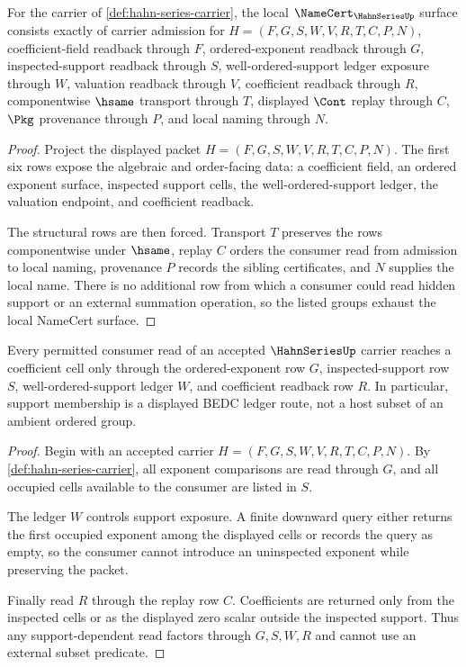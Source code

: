 \begin{theorem}
\label{thm:hahn-series-namecert-obligations}
For the carrier of \autoref{def:hahn-series-carrier}, the local $\NameCert_{\HahnSeriesUp}$ surface consists exactly of carrier admission for $H=(F,G,S,W,V,R,T,C,P,N)$, coefficient-field readback through $F$, ordered-exponent readback through $G$, inspected-support readback through $S$, well-ordered-support ledger exposure through $W$, valuation readback through $V$, coefficient readback through $R$, componentwise $\hsame$ transport through $T$, displayed $\Cont$ replay through $C$, $\Pkg$ provenance through $P$, and local naming through $N$.
\end{theorem}
\begin{proof}
Project the displayed packet $H=(F,G,S,W,V,R,T,C,P,N)$. The first six rows expose the algebraic and order-facing data: a coefficient field, an ordered exponent surface, inspected support cells, the well-ordered-support ledger, the valuation endpoint, and coefficient readback.

The structural rows are then forced. Transport $T$ preserves the rows componentwise under $\hsame$, replay $C$ orders the consumer read from admission to local naming, provenance $P$ records the sibling certificates, and $N$ supplies the local name. There is no additional row from which a consumer could read hidden support or an external summation operation, so the listed groups exhaust the local NameCert surface.
\end{proof}

\begin{theorem}
\label{thm:hahn-series-support-route}
Every permitted consumer read of an accepted $\HahnSeriesUp$ carrier reaches a coefficient cell only through the ordered-exponent row $G$, inspected-support row $S$, well-ordered-support ledger $W$, and coefficient readback row $R$. In particular, support membership is a displayed BEDC ledger route, not a host subset of an ambient ordered group.
\end{theorem}
\begin{proof}
Begin with an accepted carrier $H=(F,G,S,W,V,R,T,C,P,N)$. By \autoref{def:hahn-series-carrier}, all exponent comparisons are read through $G$, and all occupied cells available to the consumer are listed in $S$.

The ledger $W$ controls support exposure. A finite downward query either returns the first occupied exponent among the displayed cells or records the query as empty, so the consumer cannot introduce an uninspected exponent while preserving the packet.

Finally read $R$ through the replay row $C$. Coefficients are returned only from the inspected cells or as the displayed zero scalar outside the inspected support. Thus any support-dependent read factors through $G,S,W,R$ and cannot use an external subset predicate.
\end{proof}

